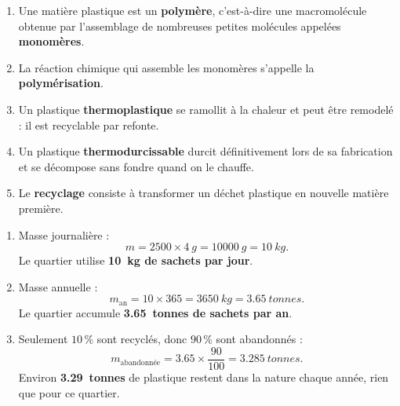 \documentclass[11pt]{article}
\begin{document}
\begin{corrige}
\begin{enumerate}
\item Une matière plastique est un \textbf{polymère}, c'est-à-dire une macromolécule obtenue par l'assemblage de nombreuses petites molécules appelées \textbf{monomères}.
\item La réaction chimique qui assemble les monomères s'appelle la \textbf{polymérisation}.
\item Un plastique \textbf{thermoplastique} se ramollit à la chaleur et peut être remodelé : il est recyclable par refonte.
\item Un plastique \textbf{thermodurcissable} durcit définitivement lors de sa fabrication et se décompose sans fondre quand on le chauffe.
\item Le \textbf{recyclage} consiste à transformer un déchet plastique en nouvelle matière première.
\end{enumerate}
\end{corrige}

\begin{corrige}
\begin{enumerate}
\item Masse journalière :
\[ m = \num{2500} \times \SI{4}{g} = \SI{10000}{g} = \SI{10}{kg}. \]
Le quartier utilise \textbf{\SI{10}{kg} de sachets par jour}.
\item Masse annuelle :
\[ m_{\text{an}} = 10 \times 365 = \SI{3650}{kg} = \SI{3,65}{tonnes}. \]
Le quartier accumule \textbf{\SI{3,65}{tonnes} de sachets par an}.
\item Seulement $10\,\%$ sont recyclés, donc $90\,\%$ sont abandonnés :
\[ m_{\text{abandonnée}} = \num{3,65} \times \frac{90}{100} = \SI{3,285}{tonnes}. \]
Environ \textbf{\SI{3,29}{tonnes}} de plastique restent dans la nature chaque année, rien que pour ce quartier.
\end{enumerate}
\end{corrige}
\end{document}
